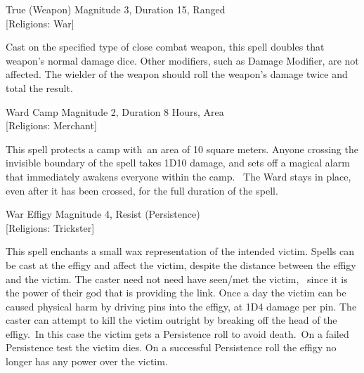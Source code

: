 \begin{rpg-spell}
{True (Weapon)}
{Magnitude 3, Duration 15, Ranged\\{[Religions: War]}}

Cast on the specified type of close combat weapon, this spell doubles that weapon’s normal damage dice. Other modifiers, such as Damage Modifier, are not affected. The wielder of the weapon should roll the weapon’s damage twice and total the result.
\end{rpg-spell}

\begin{rpg-spell}
{Ward Camp}
{Magnitude 2, Duration 8 Hours, Area\\{[Religions: Merchant]}}

This spell protects a camp with an area of 10 square meters. Anyone crossing the invisible boundary of the spell takes 1D10 damage, and sets off a magical alarm that immediately awakens everyone within the camp.  The Ward stays in place, even after it has been crossed, for the full duration of the spell.
\end{rpg-spell}

\begin{rpg-spell}
{War Effigy}
{Magnitude 4, Resist (Persistence)\\{[Religions: Trickster]}}

This spell enchants a small wax representation of the intended victim. Spells can be cast at the effigy and affect the victim, despite the distance between the effigy and the victim. The caster need not need have seen/met the victim,  since it is the power of their god that is providing the link. Once a day the victim can be caused physical harm by driving pins into the effigy, at 1D4 damage per pin. The caster can attempt to kill the victim outright by breaking off the head of the effigy. In this case the victim gets a Persistence roll to avoid death. On a failed Persistence test the victim dies. On a successful Persistence roll the effigy no longer has any power over the victim.
\end{rpg-spell}

